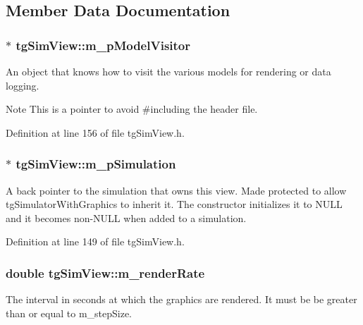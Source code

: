 \subsection{Member Data Documentation}
\hypertarget{classtg_sim_view_a4f19b09ac8cc273071fb5f7ff5e59a6b}{
\subsubsection[{m\-\_\-p\-Model\-Visitor}]{$\ast$ tg\-Sim\-View\-::m\-\_\-p\-Model\-Visitor\hspace{0.3cm}{\ttfamily [protected]}}}\label{classtg_sim_view_a4f19b09ac8cc273071fb5f7ff5e59a6b}
An object that knows how to visit the various models for rendering or data logging. \begin{DoxyNote}{Note}
This is a pointer to avoid \#including the header file. 
\end{DoxyNote}


Definition at line 156 of file tg\-Sim\-View.\-h.

\hypertarget{classtg_sim_view_a5e1b7f8fee44f02f76f8b32e3bd49d81}{
\subsubsection[{m\-\_\-p\-Simulation}]{$\ast$ tg\-Sim\-View\-::m\-\_\-p\-Simulation\hspace{0.3cm}{\ttfamily [protected]}}}\label{classtg_sim_view_a5e1b7f8fee44f02f76f8b32e3bd49d81}
A back pointer to the simulation that owns this view. Made protected to allow tg\-Simulator\-With\-Graphics to inherit it. The constructor initializes it to N\-U\-L\-L and it becomes non-\/\-N\-U\-L\-L when added to a simulation. 

Definition at line 149 of file tg\-Sim\-View.\-h.

\hypertarget{classtg_sim_view_a94f30c9f4a98a01c7171de6d7d00e92a}{
\subsubsection[{m\-\_\-render\-Rate}]{\setlength{\rightskip}{0pt plus 5cm}double tg\-Sim\-View\-::m\-\_\-render\-Rate\hspace{0.3cm}{\ttfamily [protected]}}}\label{classtg_sim_view_a94f30c9f4a98a01c7171de6d7d00e92a}
The interval in seconds at which the graphics are rendered. It must be be greater than or equal to m\-\_\-step\-Size. 

